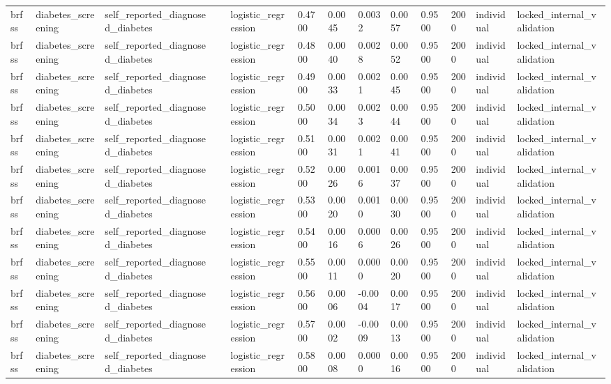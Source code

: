 \begin{tabular}{lllllllllllll}
brfss & diabetes\_screening & self\_reported\_diagnosed\_diabetes &  & logistic\_regression & 0.4700 & 0.0045 & 0.0032 & 0.0057 & 0.9500 & 2000 & individual & locked\_internal\_validation \\
brfss & diabetes\_screening & self\_reported\_diagnosed\_diabetes &  & logistic\_regression & 0.4800 & 0.0040 & 0.0028 & 0.0052 & 0.9500 & 2000 & individual & locked\_internal\_validation \\
brfss & diabetes\_screening & self\_reported\_diagnosed\_diabetes &  & logistic\_regression & 0.4900 & 0.0033 & 0.0021 & 0.0045 & 0.9500 & 2000 & individual & locked\_internal\_validation \\
brfss & diabetes\_screening & self\_reported\_diagnosed\_diabetes &  & logistic\_regression & 0.5000 & 0.0034 & 0.0023 & 0.0044 & 0.9500 & 2000 & individual & locked\_internal\_validation \\
brfss & diabetes\_screening & self\_reported\_diagnosed\_diabetes &  & logistic\_regression & 0.5100 & 0.0031 & 0.0021 & 0.0041 & 0.9500 & 2000 & individual & locked\_internal\_validation \\
brfss & diabetes\_screening & self\_reported\_diagnosed\_diabetes &  & logistic\_regression & 0.5200 & 0.0026 & 0.0016 & 0.0037 & 0.9500 & 2000 & individual & locked\_internal\_validation \\
brfss & diabetes\_screening & self\_reported\_diagnosed\_diabetes &  & logistic\_regression & 0.5300 & 0.0020 & 0.0010 & 0.0030 & 0.9500 & 2000 & individual & locked\_internal\_validation \\
brfss & diabetes\_screening & self\_reported\_diagnosed\_diabetes &  & logistic\_regression & 0.5400 & 0.0016 & 0.0006 & 0.0026 & 0.9500 & 2000 & individual & locked\_internal\_validation \\
brfss & diabetes\_screening & self\_reported\_diagnosed\_diabetes &  & logistic\_regression & 0.5500 & 0.0011 & 0.0000 & 0.0020 & 0.9500 & 2000 & individual & locked\_internal\_validation \\
brfss & diabetes\_screening & self\_reported\_diagnosed\_diabetes &  & logistic\_regression & 0.5600 & 0.0006 & -0.0004 & 0.0017 & 0.9500 & 2000 & individual & locked\_internal\_validation \\
brfss & diabetes\_screening & self\_reported\_diagnosed\_diabetes &  & logistic\_regression & 0.5700 & 0.0002 & -0.0009 & 0.0013 & 0.9500 & 2000 & individual & locked\_internal\_validation \\
brfss & diabetes\_screening & self\_reported\_diagnosed\_diabetes &  & logistic\_regression & 0.5800 & 0.0008 & 0.0000 & 0.0016 & 0.9500 & 2000 & individual & locked\_internal\_validation \\

\end{tabular}
